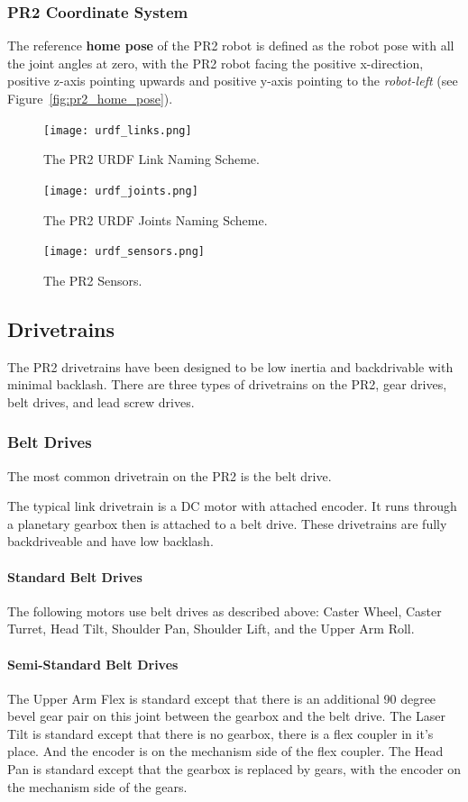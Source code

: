 \subsubsection{PR2 Coordinate System}
\label{sec:pr2_coordinate_system}
The reference {\bf home pose} of the PR2 robot is defined as the robot pose with all the joint angles at zero,
with the PR2 robot facing the positive x-direction, positive z-axis pointing upwards and positive y-axis pointing to the {\it robot-left} (see Figure~\ref{fig:pr2_home_pose}).

\begin{figure}[!h]
\centering
\texttt{[image: urdf\_links.png]}
\caption{The PR2 URDF Link Naming Scheme.}
\label{fig:urdf_link_names}
\texttt{[image: urdf\_joints.png]}
\caption{The PR2 URDF Joints Naming Scheme.}
\label{fig:urdf_joints}
\texttt{[image: urdf\_sensors.png]}
\caption{The PR2 Sensors.}
\label{fig:urdf_sensor}
\end{figure}

\subsection{Drivetrains}
The PR2 drivetrains have been designed to be low inertia and
backdrivable with minimal backlash. There are three types of
drivetrains on the PR2, gear drives, belt drives, and lead screw
drives.  

\subsubsection{Belt Drives}
The most common drivetrain on the PR2 is the belt drive.  

The typical link drivetrain is a DC motor with attached encoder.  It
runs through a planetary gearbox then is attached to a belt
drive. These drivetrains are fully backdriveable and have low
backlash.

\paragraph{Standard Belt Drives}
The following motors use belt drives as described above: Caster Wheel,
Caster Turret, Head Tilt, Shoulder Pan, Shoulder Lift, and the Upper
Arm Roll.
\paragraph{Semi-Standard Belt Drives}
The Upper Arm Flex is standard except that there is an additional 90
degree bevel gear pair on this joint between the gearbox and the belt
drive.  The Laser Tilt is standard except that there is no gearbox,
there is a flex coupler in it's place.  And the encoder is on the
mechanism side of the flex coupler.  The Head Pan is standard except
that the gearbox is replaced by gears, with the encoder on the
mechanism side of the gears.



